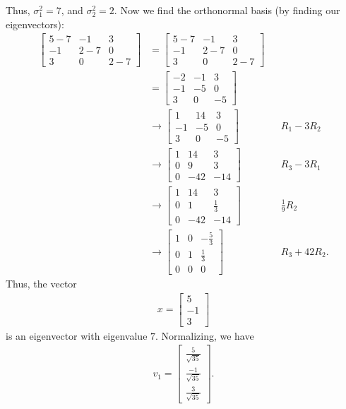 \documentclass[10pt,a4paper]{article}
\theoremstyle{definition}
\begin{document}
Thus, $\sigma_1^2 = 7$, and $\sigma_2^2 = 2$. Now we find the orthonormal basis (by finding our eigenvectors):
\begin{align*}
\begin{bmatrix}
5 - 7 & -1 & 3\\
-1 & 2 - 7 & 0\\
3 & 0 & 2 - 7
\end{bmatrix} &= \begin{bmatrix}
5 - 7 & -1 & 3\\
-1 & 2 - 7 & 0\\
3 & 0 & 2 - 7
\end{bmatrix}\\
&= \begin{bmatrix}
-2 & -1 & 3\\
-1 & -5 & 0\\
3 & 0 & -5
\end{bmatrix}\\
&\to \begin{bmatrix}
1 & 14 & 3\\
-1 & -5 & 0\\
3 & 0 & -5
\end{bmatrix} && R_1 - 3 R_2\\
&\to \begin{bmatrix}
1 & 14 & 3\\
0 & 9 & 3\\
0 & -42 & -14
\end{bmatrix} && R_3 - 3 R_1\\
&\to \begin{bmatrix}
1 & 14 & 3\\
0 & 1 & \frac{1}{3}\\
0 & -42 & -14
\end{bmatrix} && \frac{1}{9}R_2\\
&\to \begin{bmatrix}
1 & 0 & -\frac{5}{3}\\
0 & 1 & \frac{1}{3}\\
0 & 0 & 0
\end{bmatrix} && R_3 + 42 R_2.
\end{align*}
Thus, the vector
\begin{align*}
x = \begin{bmatrix}
5\\
-1\\
3
\end{bmatrix}
\end{align*}
is an eigenvector with eigenvalue $7$. Normalizing, we have
\begin{align*}
v_1 =  \begin{bmatrix}
\frac{5}{\sqrt{35}}\\
\frac{-1}{\sqrt{35}}\\
\frac{3}{\sqrt{35}}
\end{bmatrix}.
\end{align*}
\end{document}
